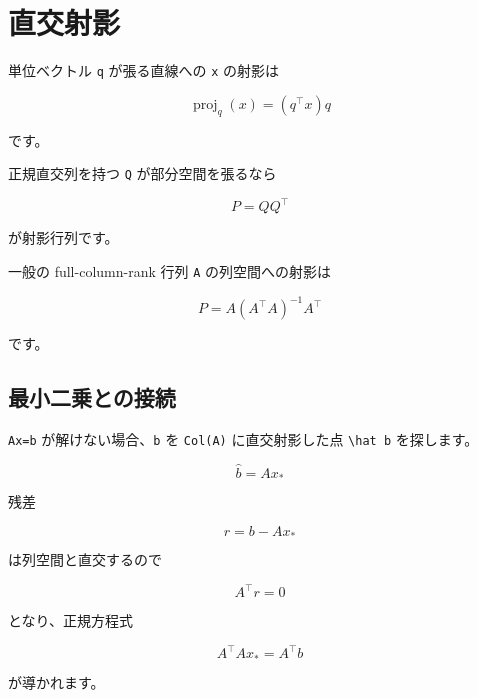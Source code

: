 \documentclass[
  11pt,
  a4paper,
]{ltjsarticle}
\author{}
\date{}
\begin{document}
\hypertarget{ux76f4ux4ea4ux5c04ux5f71}{%
\section{直交射影}\label{ux76f4ux4ea4ux5c04ux5f71}}

単位ベクトル \texttt{q} が張る直線への \texttt{x} の射影は

\[
\operatorname{proj}_q(x)=(q^\top x)q
\]

です。

正規直交列を持つ \texttt{Q} が部分空間を張るなら

\[
\boxed{P=QQ^\top}
\]

が射影行列です。

一般の full-column-rank 行列 \texttt{A} の列空間への射影は

\[
\boxed{P=A(A^\top A)^{-1}A^\top}
\]

です。

\hypertarget{ux6700ux5c0fux4e8cux4e57ux3068ux306eux63a5ux7d9a}{%
\subsection{最小二乗との接続}\label{ux6700ux5c0fux4e8cux4e57ux3068ux306eux63a5ux7d9a}}

\texttt{Ax=b} が解けない場合、\texttt{b} を \texttt{Col(A)}
に直交射影した点 \texttt{\textbackslash{}hat\ b} を探します。

\[
\hat b=Ax_*
\]

残差

\[
r=b-Ax_*
\]

は列空間と直交するので

\[
A^\top r=0
\]

となり、正規方程式

\[
A^\top Ax_*=A^\top b
\]

が導かれます。
\end{document}
